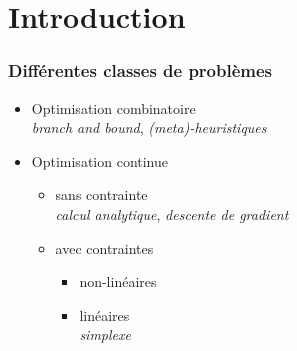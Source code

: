 \section{Introduction}

\begin{frame}
  \frametitle{Différentes classes de problèmes}

  \begin{itemize}
  \item Optimisation combinatoire\\
    \emph{branch and bound}, \emph{(meta)-heuristiques} 
  \item \alert{Optimisation continue}
    \begin{itemize}
    \item sans contrainte \\
      \emph{calcul analytique}, \emph{descente de gradient}
    \item avec contraintes  
      \begin{itemize}
        \item non-linéaires
        \item linéaires \\
        \emph{simplexe}
      \end{itemize}
    \end{itemize}
  \end{itemize}
  
\end{frame}

